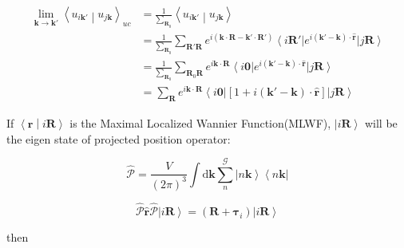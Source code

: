 \documentclass{report}
\begin{document}
\begin{equation}
  \begin{aligned}
    \lim_{\boldsymbol{k} \rightarrow \boldsymbol{k}'} \left\langle u_{i\boldsymbol{k}'} \middle| u_{j\boldsymbol{k}} \right\rangle_{uc} 
      &= \frac{1}{\sum_{\boldsymbol{R}_0}} \left\langle u_{i\boldsymbol{k}'} \middle| u_{j\boldsymbol{k}} \right\rangle \\
      &= \frac{1}{\sum_{\boldsymbol{R}_0}} \sum_{\boldsymbol{R}'\boldsymbol{R}} 
        e^{i\left( \boldsymbol{k} \cdot \boldsymbol{R} - \boldsymbol{k}' \cdot \boldsymbol{R}' \right)} 
        \left\langle i\boldsymbol{R}' \right| e^{i(\boldsymbol{k}'-\boldsymbol{k}) \cdot \hat{\boldsymbol{r}}} \left| j\boldsymbol{R} \right\rangle \\
      &= \frac{1}{\sum_{\boldsymbol{R}_0}} \sum_{\boldsymbol{R}_0\boldsymbol{R}} 
        e^{i\boldsymbol{k} \cdot \boldsymbol{R}} 
        \left\langle i\boldsymbol{0} \right| e^{i(\boldsymbol{k}'-\boldsymbol{k}) \cdot \hat{\boldsymbol{r}}} \left| j\boldsymbol{R} \right\rangle \\
      &= \sum_{\boldsymbol{R}} e^{i\boldsymbol{k} \cdot \boldsymbol{R}} 
        \left\langle i\boldsymbol{0} \right| \left[ 1 + i(\boldsymbol{k}'-\boldsymbol{k}) \cdot \hat{\boldsymbol{r}} \right] \left| j\boldsymbol{R} \right\rangle
  \end{aligned}
\end{equation}

If $\left\langle \boldsymbol{r} \middle| i\boldsymbol{R} \right\rangle$ is the Maximal Localized Wannier Function(MLWF), 
$\left| i\boldsymbol{R} \right\rangle$ will be the eigen state of projected position operator:

\begin{equation}
  \hat{\mathcal{P}} = \frac{V}{(2\pi)^3} \int \mathrm{d}\boldsymbol{k} \sum_{n}^{\mathcal{G}} \left| n\boldsymbol{k} \right\rangle \left\langle n\boldsymbol{k} \right| 
\end{equation}

\begin{equation}
  \hat{\mathcal{P}} \hat{\boldsymbol{r}} \hat{\mathcal{P}} \left| i\boldsymbol{R} \right\rangle 
    = \left( \boldsymbol{R} + \boldsymbol{\tau}_{i} \right) \left| i\boldsymbol{R} \right\rangle 
\end{equation}

\noindent
then
\end{document}
